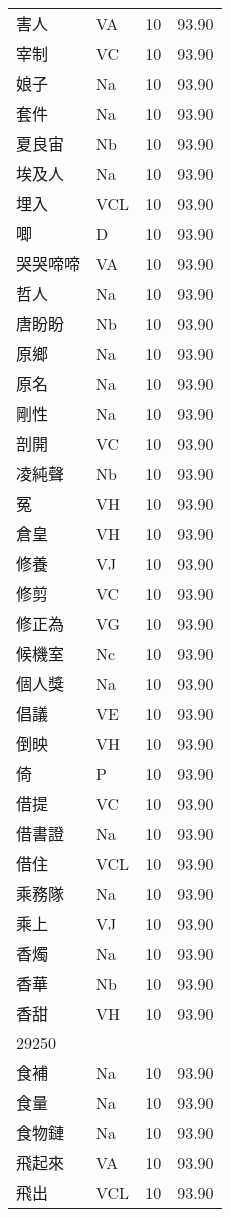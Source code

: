 \documentclass[twocolumn]{book}
\begin{document}
\begin{supertabular}{llrr}
害人 & VA & 10 &  93.90\\
宰制 & VC & 10 &  93.90\\
娘子 & Na & 10 &  93.90\\
套件 & Na & 10 &  93.90\\
夏良宙 & Nb & 10 &  93.90\\
埃及人 & Na & 10 &  93.90\\
埋入 & VCL & 10 &  93.90\\
唧 & D & 10 &  93.90\\
哭哭啼啼 & VA & 10 &  93.90\\
哲人 & Na & 10 &  93.90\\
唐盼盼 & Nb & 10 &  93.90\\
原鄉 & Na & 10 &  93.90\\
原名 & Na & 10 &  93.90\\
剛性 & Na & 10 &  93.90\\
剖開 & VC & 10 &  93.90\\
凌純聲 & Nb & 10 &  93.90\\
冤 & VH & 10 &  93.90\\
倉皇 & VH & 10 &  93.90\\
修養 & VJ & 10 &  93.90\\
修剪 & VC & 10 &  93.90\\
修正為 & VG & 10 &  93.90\\
候機室 & Nc & 10 &  93.90\\
個人獎 & Na & 10 &  93.90\\
倡議 & VE & 10 &  93.90\\
倒映 & VH & 10 &  93.90\\
倚 & P & 10 &  93.90\\
借提 & VC & 10 &  93.90\\
借書證 & Na & 10 &  93.90\\
借住 & VCL & 10 &  93.90\\
乘務隊 & Na & 10 &  93.90\\
乘上 & VJ & 10 &  93.90\\
香燭 & Na & 10 &  93.90\\
香華 & Nb & 10 &  93.90\\
香甜 & VH & 10 &  93.90\\
29250\\
食補 & Na & 10 &  93.90\\
食量 & Na & 10 &  93.90\\
食物鏈 & Na & 10 &  93.90\\
飛起來 & VA & 10 &  93.90\\
飛出 & VCL & 10 &  93.90\\

\end{supertabular}
\end{document}
